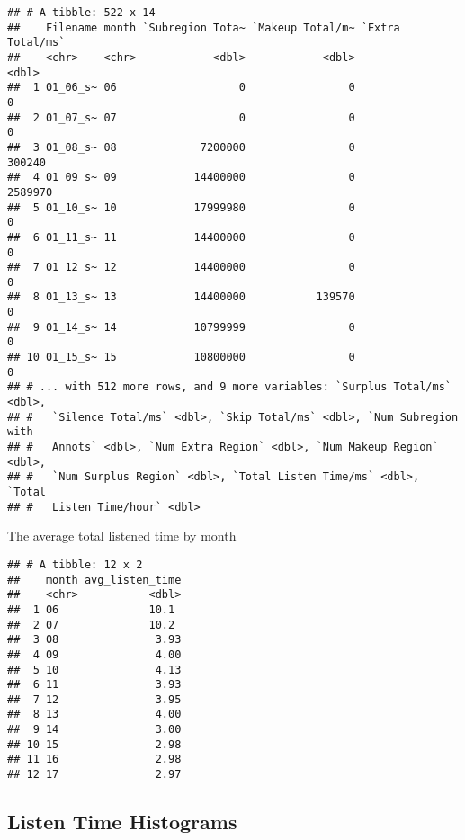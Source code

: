 \documentclass[]{article}
\newenvironment{Shaded}{\begin{snugshade}}{\end{snugshade}}
\newcommand{\KeywordTok}[1]{\textcolor[rgb]{0.13,0.29,0.53}{\textbf{{#1}}}}
\newcommand{\DataTypeTok}[1]{\textcolor[rgb]{0.13,0.29,0.53}{{#1}}}
\newcommand{\StringTok}[1]{\textcolor[rgb]{0.31,0.60,0.02}{{#1}}}
\newcommand{\NormalTok}[1]{{#1}}
\begin{document}
\begin{verbatim}
## # A tibble: 522 x 14
##    Filename month `Subregion Tota~ `Makeup Total/m~ `Extra Total/ms`
##    <chr>    <chr>            <dbl>            <dbl>            <dbl>
##  1 01_06_s~ 06                   0                0                0
##  2 01_07_s~ 07                   0                0                0
##  3 01_08_s~ 08             7200000                0           300240
##  4 01_09_s~ 09            14400000                0          2589970
##  5 01_10_s~ 10            17999980                0                0
##  6 01_11_s~ 11            14400000                0                0
##  7 01_12_s~ 12            14400000                0                0
##  8 01_13_s~ 13            14400000           139570                0
##  9 01_14_s~ 14            10799999                0                0
## 10 01_15_s~ 15            10800000                0                0
## # ... with 512 more rows, and 9 more variables: `Surplus Total/ms` <dbl>,
## #   `Silence Total/ms` <dbl>, `Skip Total/ms` <dbl>, `Num Subregion with
## #   Annots` <dbl>, `Num Extra Region` <dbl>, `Num Makeup Region` <dbl>,
## #   `Num Surplus Region` <dbl>, `Total Listen Time/ms` <dbl>, `Total
## #   Listen Time/hour` <dbl>
\end{verbatim}

The average total listened time by month

\begin{Shaded}
\end{Shaded}

\begin{verbatim}
## # A tibble: 12 x 2
##    month avg_listen_time
##    <chr>           <dbl>
##  1 06              10.1 
##  2 07              10.2 
##  3 08               3.93
##  4 09               4.00
##  5 10               4.13
##  6 11               3.93
##  7 12               3.95
##  8 13               4.00
##  9 14               3.00
## 10 15               2.98
## 11 16               2.98
## 12 17               2.97
\end{verbatim}

\subsection{Listen Time Histograms}\label{listen-time-histograms}
\end{document}
